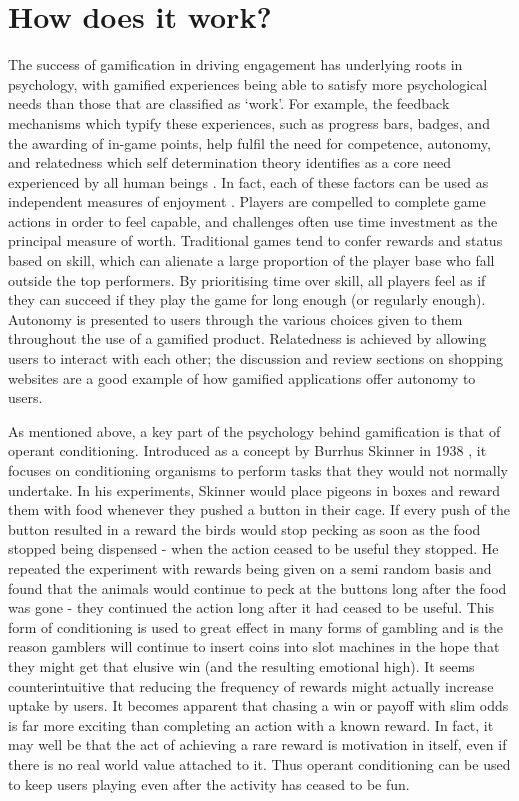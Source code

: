 \documentclass[12pt,a4paper,twoside]{report}
\begin{document}
\section{How does it work?}
The success of gamification in driving engagement has underlying roots in psychology, with gamified experiences being able to satisfy more psychological needs than those that are classified as `work'. For example, the feedback mechanisms which typify these experiences, such as progress bars, badges, and the awarding of in-game points, help fulfil the need for competence, autonomy, and relatedness which self determination theory identifies as a core need experienced by all human beings \cite{przybylski2010motivational}. In fact, each of these factors can be used as independent measures of enjoyment \cite{kapp2012gamification}. Players are compelled to complete game actions in order to feel capable, and challenges often use time investment as the principal measure of worth. Traditional games tend to confer rewards and status based on skill, which can alienate a large proportion of the player base who fall outside the top performers. By prioritising time over skill, all players feel as if they can succeed if they play the game for long enough (or regularly enough). Autonomy is presented to users through the various choices given to them throughout the use of a gamified product. Relatedness is achieved by allowing users to interact with each other; the discussion and review sections on shopping websites are a good example of how gamified applications offer autonomy to users.

As mentioned above, a key part of the psychology behind gamification is that of operant conditioning. Introduced as a concept by Burrhus Skinner in 1938 \cite{skinner1938behavior}, it focuses on conditioning organisms to perform tasks that they would not normally undertake. In his experiments, Skinner would place pigeons in boxes and reward them with food whenever they pushed a button in their cage. If every push of the button resulted in a reward the birds would stop pecking as soon as the food stopped being dispensed - when the action ceased to be useful they stopped. He repeated the experiment with rewards being given on a semi random basis and found that the animals would continue to peck at the buttons long after the food was gone \cite{kapp2012gamification} - they continued the action long after it had ceased to be useful. This form of conditioning is used to great effect in many forms of gambling and is the reason gamblers will continue to insert coins into slot machines in the hope that they might get that elusive win (and the resulting emotional high). It seems counterintuitive that reducing the frequency of rewards might actually increase uptake by users. It becomes apparent that chasing a win or payoff with slim odds is far more exciting than completing an action with a known reward. In fact, it may well be that the act of achieving a rare reward is motivation in itself, even if there is no real world value attached to it. Thus operant conditioning can be used to keep users playing even after the activity has ceased to be fun.
\end{document}
